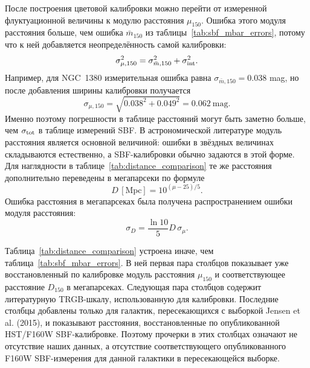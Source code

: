 \documentclass[12pt,a4paper]{article}
\begin{document}
После построения цветовой калибровки можно перейти от измеренной флуктуационной величины к модулю расстояния $\mu_{150}$. Ошибка этого модуля расстояния больше, чем ошибка $\bar{m}_{150}$ из таблицы~\ref{tab:sbf_mbar_errors}, потому что к ней добавляется неопределённость самой калибровки:
\begin{equation}
    \sigma_{\mu,150}^2 =
    \sigma_{\bar{m},150}^2 + \sigma_{\rm int}^2.
\end{equation}
Например, для NGC~1380 измерительная ошибка равна $\sigma_{\bar{m},150}=0.038$ mag, но после добавления ширины калибровки получается
\begin{equation}
    \sigma_{\mu,150} = \sqrt{0.038^2 + 0.049^2} = 0.062~\mathrm{mag}.
\end{equation}
Именно поэтому погрешности в таблице расстояний могут быть заметно больше, чем $\sigma_{\rm tot}$ в таблице измерений SBF. В астрономической литературе модуль расстояния является основной величиной: ошибки в звёздных величинах складываются естественно, а SBF-калибровки обычно задаются в этой форме. Для наглядности в таблице~\ref{tab:distance_comparison} те же расстояния дополнительно переведены в мегапарсеки по формуле
\begin{equation}
    D\,[\mathrm{Mpc}] = 10^{(\mu-25)/5}.
\end{equation}
Ошибка расстояния в мегапарсеках была получена распространением ошибки модуля расстояния:
\begin{equation}
    \sigma_D = \frac{\ln 10}{5} D\,\sigma_\mu.
\end{equation}



Таблица~\ref{tab:distance_comparison} устроена иначе, чем таблица~\ref{tab:sbf_mbar_errors}. В ней первая пара столбцов показывает уже восстановленный по калибровке модуль расстояния $\mu_{150}$ и соответствующее расстояние $D_{150}$ в мегапарсеках. Следующая пара столбцов содержит литературную TRGB-шкалу, использованную для калибровки. Последние столбцы добавлены только для галактик, пересекающихся с выборкой Jensen et al. (2015), и показывают расстояния, восстановленные по опубликованной HST/F160W SBF-калибровке. Поэтому прочерки в этих столбцах означают не отсутствие наших данных, а отсутствие соответствующего опубликованного F160W SBF-измерения для данной галактики в пересекающейся выборке.
\end{document}
